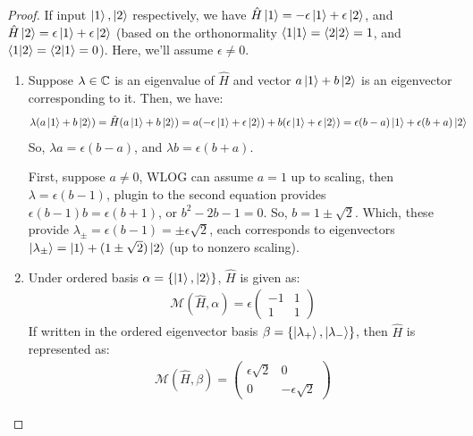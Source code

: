 \documentclass{article}
\begin{document}
\begin{proof}

    If input $\ket{1}, \ket{2}$ respectively, we have $\hat{H}\ket{1} = -\epsilon\ket{1} + \epsilon\ket{2}$, and $\hat{H}\ket{2} = \epsilon \ket{1}+\epsilon\ket{2}$ (based on the orthonormality $\braket{1}=\braket{2}=1$, and $\braket{1}{2}=\braket{2}{1}=0$). Here, we'll assume $\epsilon\neq 0$.

    \begin{enumerate}
        \item Suppose $\lambda\in\mathbb{C}$ is an eigenvalue of $\hat{H}$ and vector $a\ket{1}+b\ket{2}$ is an eigenvector corresponding to it. Then, we have:
        \begin{align}
            \lambda(a\ket{1}+b\ket{2}) &=\hat{H}(a\ket{1}+b\ket{2})=a(-\epsilon\ket{1}+\epsilon\ket{2})+b(\epsilon\ket{1}+\epsilon\ket{2}) = \epsilon(b-a)\ket{1}+\epsilon(b+a)\ket{2}
        \end{align}
        So, $\lambda a=\epsilon(b-a)$, and $\lambda b=\epsilon(b+a)$.

        First, suppose $a\neq 0$, WLOG can assume $a=1$ up to scaling, then $\lambda=\epsilon(b-1)$, plugin to the second equation provides $\epsilon(b-1)b=\epsilon(b+1)$, or $b^2-2b-1=0$. So, $b=1\pm \sqrt{2}$. Which, these provide $\lambda_\pm = \epsilon(b-1) = \pm \epsilon\sqrt{2}$, each corresponds to eigenvectors $\ket{\lambda_\pm} = \ket{1}+(1\pm\sqrt{2})\ket{2}$ (up to nonzero scaling).
        
        \hfil

        \item Under ordered basis $\alpha = \{\ket{1},\ket{2}\}$, $\hat{H}$ is given as:
        \begin{align}
            \mathcal{M}(\hat{H},\alpha)=\epsilon\begin{pmatrix}
                -1&1\\1&1
            \end{pmatrix}
        \end{align}
        If written in the ordered eigenvector basis $\beta=\{\ket{\lambda_+},\ket{\lambda_-}\}$, then $\hat{H}$ is represented as:
        \begin{align}
            \mathcal{M}(\hat{H},\beta)=\begin{pmatrix}
                \epsilon\sqrt{2} &0\\0&-\epsilon\sqrt{2}
            \end{pmatrix}
        \end{align}
    \end{enumerate}
\end{proof}
\end{document}
